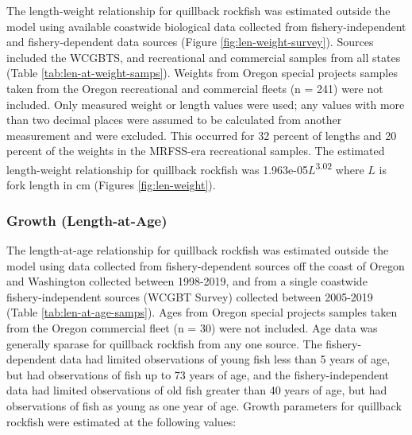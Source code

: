 \documentclass[11pt,
  english,
  a4paper,
]{article}
\begin{document}
The length-weight relationship for quillback rockfish was estimated outside the model using available coastwide biological data collected from fishery-independent and fishery-dependent data sources (Figure \ref{fig:len-weight-survey}). Sources included the WCGBTS, and recreational and commercial samples from all states (Table \ref{tab:len-at-weight-samps}). Weights from Oregon special projects samples taken from the Oregon recreational and commercial fleets (n = 241) were not included. Only measured weight or length values were used; any values with more than two decimal places were assumed to be calculated from another measurement and were excluded. This occurred for 32 percent of lengths and 20 percent of the weights in the MRFSS-era recreational samples. The estimated length-weight relationship for quillback rockfish was 1.963e-05{\(L\)\leavevmode\tagmcend\tagstructend}\textsuperscript{3.02} where {\(L\)\leavevmode\tagmcend\tagstructend} is fork length in cm (Figures \ref{fig:len-weight}).

\leavevmode\tagmcend\tagstructend\par


\hypertarget{growth-length-at-age}{%
\subsubsection{Growth (Length-at-Age)}\label{growth-length-at-age}}

\leavevmode\tagmcend\tagstructend


The length-at-age relationship for quillback rockfish was estimated outside the model using data collected from fishery-dependent sources off the coast of Oregon and Washington collected between 1998-2019, and from a single coastwide fishery-independent sources (WCGBT Survey) collected between 2005-2019 (Table \ref{tab:len-at-age-samps}). Ages from Oregon special projects samples taken from the Oregon commercial fleet (n = 30) were not included. Age data was generally sparase for quillback rockfish from any one source. The fishery-dependent data had limited observations of young fish less than 5 years of age, but had observations of fish up to 73 years of age, and the fishery-independent data had limited observations of old fish greater than 40 years of age, but had observations of fish as young as one year of age. Growth parameters for quillback rockfish were estimated at the following values:
\end{document}
